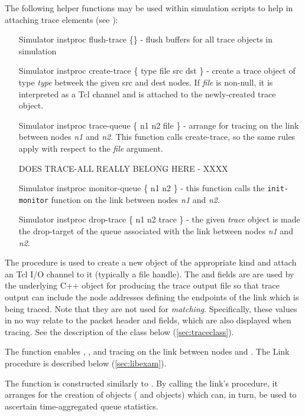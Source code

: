 The following helper functions may be used within simulation
scripts to help in attaching trace elements (see ):
\begin{small}
\begin{itemize}
\item[Simulator instproc flush-trace \{\}] - flush buffers for all
trace objects in simulation
\item[Simulator instproc create-trace \{ type file src dst \}] - create a
trace object of type {\em type} betweek the given src and dest nodes.
If {\em file} is non-null, it is interpreted as a Tcl channel and is
attached to the newly-created trace object.
\item[Simulator instproc trace-queue \{ n1 n2 file \}] - arrange for
tracing on the link between nodes {\em n1} and {\em n2}.  This function
calls create-trace, so the same rules apply with respect to the {\em file}
argument.
\item[DOES TRACE-ALL REALLY BELONG HERE] - XXXX
\item[Simulator instproc monitor-queue \{ n1 n2 \}] - this function
calls the {\tt init-monitor} function on the link between nodes {\em n1}
and {\em n2}.
\item[Simulator instproc drop-trace \{ n1 n2 trace \}] - the given {\em trace}
object is made the drop-target of the queue associated with the link
between nodes {\em n1} and {\em n2}.
\end{itemize}
\end{small}
The  procedure is used to create a new 
object of the appropriate kind and attach an Tcl I/O channel to it
(typically a file handle).
The  and  fields are are used by the underlying C++
object for producing the trace output file so that trace output
can include the node addresses defining the endpoints of the link which
is being traced.
Note that they are not used for {\em matching}.  Specifically, these
values in no way relate to the packet header  and 
fields, which are also displayed when tracing.
See the description of the 
class below (\ref{sec:traceclass}).

The  function enables
, , and  tracing on the link
between nodes  and .
The Link  procedure is described below (\ref{sec:libexam}).

The  function is constructed similarly to
.
By calling the link's  procedure, it arranges
for the creation of objects ( and 
objects) which can, in turn, be used to ascertain time-aggregated
queue statistics.

